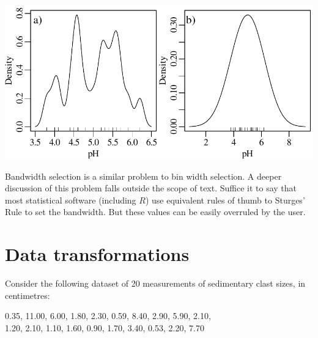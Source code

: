 \noindent\begin{minipage}[t][][b]{.55\textwidth}
  \includegraphics[width=\textwidth]{../figures/bandwidth.pdf}\\
\end{minipage}
\begin{minipage}[t][][t]{.45\textwidth}
\end{minipage}

Bandwidth selection is a similar problem to bin width selection.  A
deeper discussion of this problem falls outside the scope of text.
Suffice it to say that most statistical software (including $R$) use
equivalent rules of thumb to Sturges' Rule to set the bandwidth.  But
these values can be easily overruled by the user.

\section{Data transformations}
\label{sec:transformations}

Consider the following dataset of 20 measurements of sedimentary
clast sizes, in centimetres:

\begin{center}
0.35, 11.00, 6.00, 1.80, 2.30, 0.59, 8.40, 2.90, 5.90, 2.10,\\
1.20, 2.10, 1.10, 1.60, 0.90, 1.70, 3.40, 0.53, 2.20, 7.70
\end{center}

